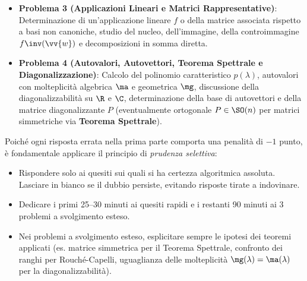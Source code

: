 \begin{enumerate}
\begin{itemize}
\begin{itemize}
            \item \textbf{Problema 3 (Applicazioni Lineari e Matrici Rappresentative)}: Determinazione di un'applicazione lineare $f$ o della matrice associata rispetto a basi non canoniche, studio del nucleo, dell'immagine, della controimmagine $f\inv(\vv{w})$ e decomposizioni in somma diretta.
            \item \textbf{Problema 4 (Autovalori, Autovettori, Teorema Spettrale e Diagonalizzazione)}: Calcolo del polinomio caratteristico $p(\lambda)$, autovalori con molteplicità algebrica $\ma$ e geometrica $\mg$, discussione della diagonalizzabilità su $\R$ e $\C$, determinazione della base di autovettori e della matrice diagonalizzante $P$ (eventualmente ortogonale $P \in \SO(n)$ per matrici simmetriche via \textbf{Teorema Spettrale}).
        \end{itemize}
    \end{itemize}
\end{enumerate}

\begin{esame}
Poiché ogni risposta errata nella prima parte comporta una penalità di $-1$ punto, è fondamentale applicare il principio di \emph{prudenza selettiva}:
\begin{itemize}
    \item Rispondere solo ai quesiti sui quali si ha certezza algoritmica assoluta. Lasciare in bianco se il dubbio persiste, evitando risposte tirate a indovinare.
    \item Dedicare i primi 25--30 minuti ai quesiti rapidi e i restanti 90 minuti ai 3 problemi a svolgimento esteso.
    \item Nei problemi a svolgimento esteso, esplicitare sempre le ipotesi dei teoremi applicati (es. matrice simmetrica per il Teorema Spettrale, confronto dei ranghi per Rouché-Capelli, uguaglianza delle molteplicità $\mg(\lambda) = \ma(\lambda)$ per la diagonalizzabilità).
\end{itemize}
\end{esame}

